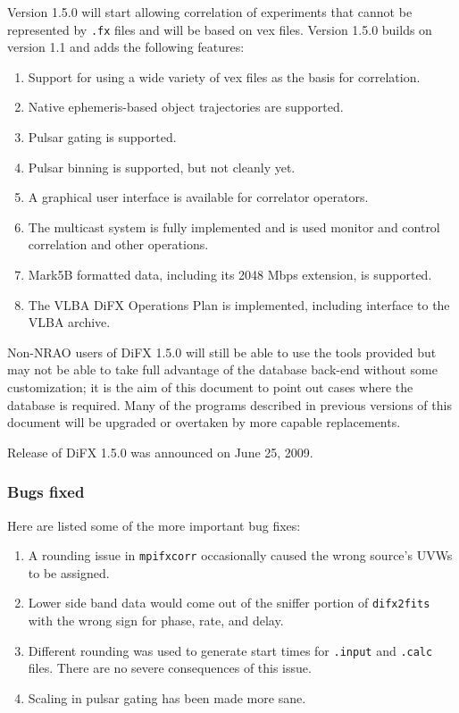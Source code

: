Version 1.5.0 will start allowing correlation of experiments that cannot be represented by {\tt .fx} files and will be based on vex files.
Version 1.5.0 builds on version 1.1 and adds the following features:
\begin{enumerate}
\item Support for using a wide variety of vex files as the basis for correlation.
\item Native ephemeris-based object trajectories are supported.
\item Pulsar gating is supported.
\item Pulsar binning is supported, but not cleanly yet.
\item A graphical user interface is available for correlator operators.
\item The multicast system is fully implemented and is used monitor and control correlation and other operations.
\item Mark5B formatted data, including its 2048 Mbps extension, is supported.
\item The VLBA DiFX Operations Plan \cite{opsplan} is implemented, including interface to the VLBA archive.
\end{enumerate}
Non-NRAO users of DiFX 1.5.0 will still be able to use the tools provided but may not be able to take full advantage of the database back-end without some customization; it is the aim of this document to point out cases where the database is required.
Many of the programs described in previous versions of this document will be upgraded or overtaken by more capable replacements.

Release of DiFX 1.5.0 was announced on June 25, 2009.


\subsubsection{Bugs fixed}

Here are listed some of the more important bug fixes:
\begin{enumerate}
\item A rounding issue in {\tt mpifxcorr} occasionally caused the wrong source's UVWs to be assigned.
\item Lower side band data would come out of the sniffer portion of {\tt difx2fits} with the wrong sign for phase, rate, and delay.
\item Different rounding was used to generate start times for {\tt .input} and {\tt .calc} files.
There are no severe consequences of this issue.
\item Scaling in pulsar gating has been made more sane.
\end{enumerate}


